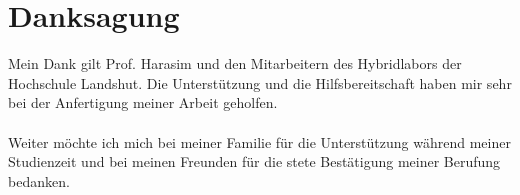 \documentclass[12pt]{scrreprt} %
\begin{document}
\chapter*{Danksagung}
Mein Dank gilt Prof. Harasim und den Mitarbeitern des Hybridlabors der Hochschule Landshut. Die Unterstützung und die Hilfsbereitschaft haben mir sehr bei der Anfertigung meiner Arbeit geholfen.
\\
\\
Weiter möchte ich mich bei meiner Familie für die Unterstützung während meiner Studienzeit und bei meinen Freunden für die stete Bestätigung meiner Berufung bedanken.
\chapter*{ } %

\tableofcontents
\lstset{language =C}
\end{document}
